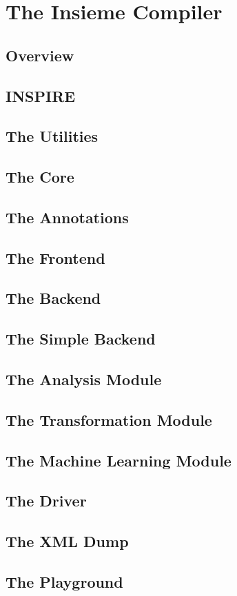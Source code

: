 \chapter{The Insieme Compiler} \label{cap:compiler}

\section{Overview}
\section{INSPIRE}
\section{The Utilities}
\section{The Core}
\section{The Annotations}
\section{The Frontend}
\section{The Backend}
\section{The Simple Backend}
\section{The Analysis Module}
\section{The Transformation Module}
\section{The Machine Learning Module}
\section{The Driver}
\section{The XML Dump}
\section{The Playground}
